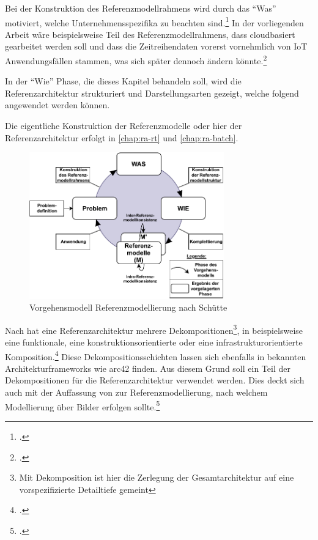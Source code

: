 Bei der Konstruktion des Referenzmodellrahmens wird durch das \enquote{Was} motiviert, welche Unternehmensspezifika zu beachten sind.\footcite[Vgl. auch im Folgenden][186]{Schutte.1998} In der vorliegenden Arbeit wäre beispielsweise Teil des Referenzmodellrahmens, dass cloudbasiert gearbeitet werden soll und dass die Zeitreihendaten vorerst vornehmlich von \ac{IoT} Anwendungsfällen stammen, was sich später dennoch ändern könnte.\footcite[Vgl. auch im Folgenden][187\psq]{Schutte.1998} 

In der \enquote{Wie} Phase, die dieses Kapitel behandeln soll, wird die Referenzarchitektur strukturiert und Darstellungsarten gezeigt, welche folgend angewendet werden können. 

Die eigentliche Konstruktion der Referenzmodelle oder hier der Referenzarchitektur erfolgt in \autoref{chap:ra-rt} und \autoref{chap:ra-batch}.

\begin{figure}[H]
\centering
\includegraphics[width=0.75\textwidth]{graphics/Vorgehen-Referenzmodellierung.pdf}
\caption[Vorgehensmodell Referenzmodellierung nach Schütte]{Vorgehensmodell Referenzmodellierung nach Schütte\footnotemark}
\label{abb:VorgehensmodellReferenzmodellierung}
\end{figure}

Nach \citeauthor{Muller.2020} hat eine Referenzarchitektur mehrere Dekompositionen\footnote{Mit Dekomposition ist hier die Zerlegung der Gesamtarchitektur auf eine vorspezifizierte Detailtiefe gemeint}, in beispielsweise eine funktionale, eine konstruktionsorientierte oder eine infrastrukturorientierte Komposition.\footcite[Vgl.][7]{Muller.2020} Diese Dekompositionsschichten lassen sich ebenfalls in bekannten Architekturframeworks wie arc42 finden. Aus diesem Grund soll ein Teil der Dekompositionen für die Referenzarchitektur verwendet werden. Dies deckt sich auch mit der Auffassung von \citeauthor{Schutte.1998} zur Referenzmodellierung, nach welchem Modellierung über Bilder erfolgen sollte.\footcite[Vgl.][185]{Schutte.1998}

